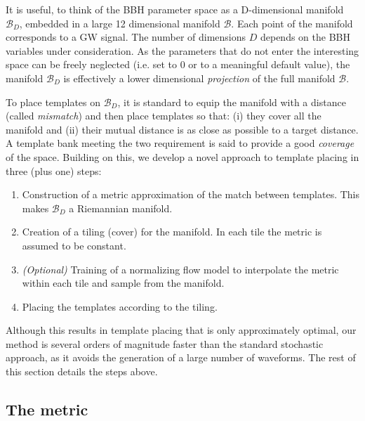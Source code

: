 \documentclass[twocolumn,showpacs,preprintnumbers,nofootinbib,prd,
superscriptaddress,10pt]{revtex4-2}
\begin{document}
It is useful, to think of the BBH parameter space as a D-dimensional manifold $\mathcal{B}_D$, embedded in a large 12 dimensional manifold $\mathcal{B}$. Each point of the manifold corresponds to a GW signal. The number of dimensions $D$ depends on the BBH variables under consideration.
As the parameters that do not enter the interesting space can be freely neglected (i.e. set to $0$ or to a meaningful default value), the manifold $\mathcal{B}_D$ is effectively a lower dimensional {\it projection} of the full manifold $\mathcal{B}$.

%
To place templates on $\mathcal{B}_D$, it is standard to equip the manifold with a distance (called {\it mismatch}) and then place templates so that: (i) they cover all the manifold and (ii) their mutual distance is as close as possible to a target distance.
A template bank meeting the two requirement is said to provide a good {\it coverage} of the space.
Building on this, we develop a novel approach to template placing in three (plus one) steps:

\begin{enumerate}
	\item Construction of a metric approximation of the match between templates. This makes $\mathcal{B}_D$ a Riemannian manifold.
	\item Creation of a tiling (cover) for the manifold. In each tile the metric is assumed to be constant.
	\item \textit{(Optional)} Training of a normalizing flow model to interpolate the metric within each tile and sample from the manifold. 
	\item Placing the templates according to the tiling.
\end{enumerate}
Although this results in template placing that is only approximately optimal, our method is several orders of magnitude faster than the standard stochastic approach, as it avoids the generation of a large number of waveforms.
The rest of this section details the steps above.

\subsection{The metric} \label{sec:metric}
\end{document}
